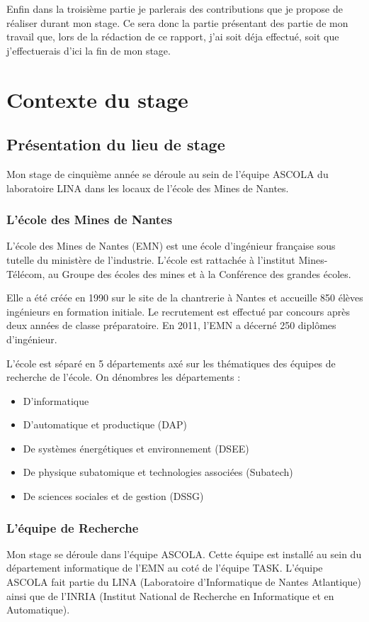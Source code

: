 \documentclass[a4paper, 11pt]{report}
\begin{document}
Enfin dans la troisième partie je parlerais des contributions que je propose de réaliser durant mon stage. Ce sera donc la partie présentant des partie de mon travail que, lors de la rédaction de ce rapport, j'ai soit déja effectué, soit que j'effectuerais d'ici la fin de mon stage.

\chapter{Contexte du stage}
\section{Présentation du lieu de stage}
Mon stage de cinquième année se déroule au sein de l’équipe ASCOLA du laboratoire LINA dans les locaux de l’école des Mines de Nantes.
\subsection{L'école des Mines de Nantes}
L’école des Mines de Nantes (EMN) est une école d’ingénieur française sous tutelle du ministère de l’industrie. L’école est rattachée à l’institut Mines-Télécom, au Groupe des écoles des mines et à la Conférence des grandes écoles.

Elle a été créée en 1990 sur le site de la chantrerie à Nantes et accueille 850 élèves ingénieurs en formation initiale. Le recrutement est effectué par concours après deux années de classe préparatoire. En 2011, l’EMN a décerné 250 diplômes d’ingénieur.

L’école est séparé en 5 départements axé sur les thématiques des équipes de recherche de l'école. On dénombres les départements :
\begin{itemize}
	\item D'informatique
	\item D'automatique et productique (DAP)
	\item De systèmes énergétiques et environnement (DSEE)
	\item De physique subatomique et technologies associées (Subatech)
	\item De sciences sociales et de gestion (DSSG)
\end{itemize}

\subsection{L'équipe de Recherche}
Mon stage se déroule dans l'équipe ASCOLA. Cette équipe est installé au sein du département informatique de l’EMN au coté de l'équipe TASK. L'équipe ASCOLA fait partie du LINA (Laboratoire d'Informatique de Nantes Atlantique) ainsi que de l'INRIA (Institut National de Recherche en Informatique et en Automatique).
\end{document}
